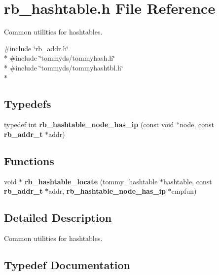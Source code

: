 \section{rb\+\_\+hashtable.\+h File Reference}
\label{rb__hashtable_8h}


Common utilities for hashtables.  


{\ttfamily \#include \char`\"{}rb\+\_\+addr.\+h\char`\"{}}\\*
{\ttfamily \#include \char`\"{}tommyds/tommyhash.\+h\char`\"{}}\\*
{\ttfamily \#include \char`\"{}tommyds/tommyhashtbl.\+h\char`\"{}}\\*
\subsection*{Typedefs}
\begin{DoxyCompactItemize}
\item 
typedef int {\bf rb\+\_\+hashtable\+\_\+node\+\_\+has\+\_\+ip} (const void $\ast$node, const {\bf rb\+\_\+addr\+\_\+t} $\ast$addr)
\end{DoxyCompactItemize}
\subsection*{Functions}
\begin{DoxyCompactItemize}
\item 
void $\ast$ {\bf rb\+\_\+hashtable\+\_\+locate} (tommy\+\_\+hashtable $\ast$hashtable, const {\bf rb\+\_\+addr\+\_\+t} $\ast$addr, {\bf rb\+\_\+hashtable\+\_\+node\+\_\+has\+\_\+ip} $\ast$cmpfun)
\end{DoxyCompactItemize}


\subsection{Detailed Description}
Common utilities for hashtables. 



\subsection{Typedef Documentation}
